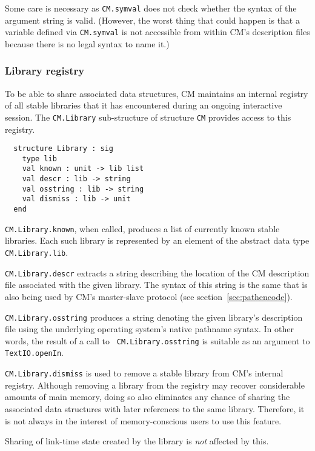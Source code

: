 \documentclass{article}
\begin{document}
Some care is necessary as {\tt CM.symval} does not check whether the
syntax of the argument string is valid.  (However, the worst thing
that could happen is that a variable defined via {\tt CM.symval} is
not accessible from within CM's description files because there is no
legal syntax to name it.)

\subsubsection*{Library registry}

To be able to share associated data structures, CM maintains an
internal registry of all stable libraries that it has encountered
during an ongoing interactive session.  The {\tt CM.Library}
sub-structure of structure {\tt CM} provides access to this registry.

\begin{verbatim}
  structure Library : sig
    type lib
    val known : unit -> lib list
    val descr : lib -> string
    val osstring : lib -> string
    val dismiss : lib -> unit
  end
\end{verbatim}

{\tt CM.Library.known}, when called, produces a list of currently
known stable libraries.  Each such library is represented by an
element of the abstract data type {\tt CM.Library.lib}.

{\tt CM.Library.descr} extracts a string describing the location of
the CM description file associated with the given library.  The syntax
of this string is the same that is also being used by CM's
master-slave protocol (see section~\ref{sec:pathencode}).

{\tt CM.Library.osstring} produces a string denoting the given
library's description file using the underlying operating system's
native pathname syntax.  In other words, the result of a call to {\tt
CM.Library.osstring} is suitable as an argument to {\tt
TextIO.openIn}.

{\tt CM.Library.dismiss} is used to remove a stable library from CM's
internal registry.  Although removing a library from the registry may
recover considerable amounts of main memory, doing so also eliminates
any chance of sharing the associated data structures with later
references to the same library.  Therefore, it is not always in the
interest of memory-conscious users to use this feature.

Sharing of link-time state created by the library is {\em not}
affected by this.
\end{document}
